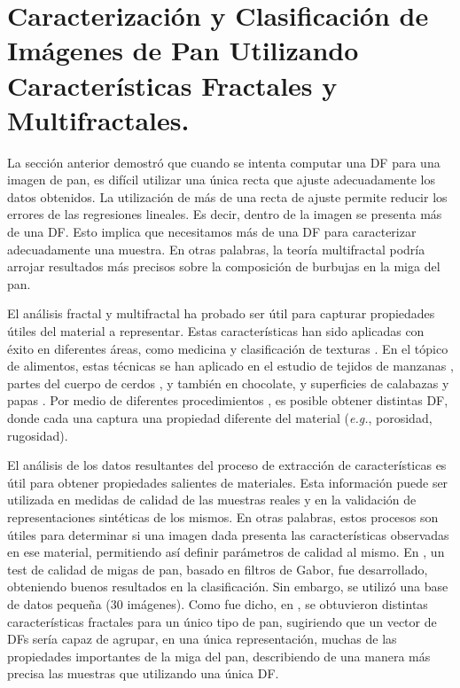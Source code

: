 \section[Características Multifractales del pan]{Caracterización y Clasificación de Imágenes de Pan Utilizando Características Fractales y Multifractales.}

La sección anterior demostró que cuando se intenta computar una DF para una imagen de pan, es difícil utilizar una única recta que ajuste adecuadamente los datos obtenidos.
La utilización de más de una recta de ajuste permite reducir los errores de las regresiones lineales.
Es decir, dentro de la imagen se presenta más de una DF.
Esto implica que necesitamos más de una DF para caracterizar adecuadamente una muestra.
En otras palabras, la teoría multifractal podría arrojar resultados más precisos sobre la composición de burbujas en la miga del pan.

El análisis fractal y multifractal ha probado ser útil para capturar propiedades útiles del material a representar.
Estas características han sido aplicadas con éxito en diferentes áreas, como medicina \cite{Andjelkovic2008,Yu2011} y clasificación de texturas \cite{Wendt2009}.
En el tópico de alimentos, estas técnicas se han aplicado en el estudio de tejidos de manzanas \cite{Mendoza2010}, partes del cuerpo de cerdos \cite{Serrano2012}, y también en chocolate, y superficies de calabazas y papas \cite{Quevedo2002}.
Por medio de diferentes procedimientos \cite{Peitgen2004,Gonzales2008}, es posible obtener distintas DF, donde cada una captura una propiedad diferente del material ({\em e.g.}, porosidad, rugosidad).

El análisis de los datos resultantes del proceso de extracción de características es útil para obtener propiedades salientes de materiales.
Esta información puede ser utilizada en medidas de calidad de las muestras reales y en la validación de representaciones sintéticas de los mismos.
En otras palabras, estos procesos son útiles para determinar si una imagen dada presenta las características observadas en ese material, permitiendo así definir parámetros de calidad al mismo.
En \cite{Fan2006}, un test de calidad de migas de pan, basado en filtros de Gabor, fue desarrollado, obteniendo buenos resultados en la clasificación.
Sin embargo, se utilizó una base de datos pequeña ($30$ imágenes).
Como fue dicho, en \cite{Gonzales2008}, se obtuvieron distintas características fractales para un único tipo de pan, sugiriendo que un vector de DFs sería capaz de agrupar, en una única representación, muchas de las propiedades importantes de la miga del pan, describiendo de una manera más precisa las muestras que utilizando una única DF.

